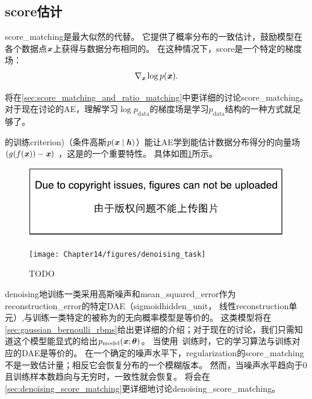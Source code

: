 
\subsection{\gls{score}估计}
\label{sec:estimating_the_score}
\gls{score_matching}\citep{Hyvarinen-2005}是最大似然的代替。
它提供了概率分布的一致估计，鼓励模型在各个数据点$\boldsymbol{\mathit{x}}$上获得与数据分布相同的。
在这种情况下，\gls{score}是一个特定的梯度场：
\begin{align}
 \nabla_{\boldsymbol{\mathit{x}}} \log p(\boldsymbol{\mathit{x}}) .
\end{align}

将在\ref{sec:score_matching_and_ratio_matching}中更详细的讨论\gls{score_matching}。
对于现在讨论的\gls{AE}，理解学习$\log p_{\text{data}}$的梯度场是学习$p_{\text{data}}$结构的一种方式就足够了。


的训练\gls{criterion})（条件高斯$p(\boldsymbol{\mathit{x}} \mid \boldsymbol{\mathit{h}})$）能让\gls{AE}学到能估计数据分布得分的向量场$(g(f(\boldsymbol{\mathit{x}}))-\boldsymbol{\mathit{x}})$ ，这是的一个重要特性。
具体如图\ref{fig:chap14_denoising_task}所示。

\begin{figure}[!htb]
\ifOpenSource
\centerline{\includegraphics{figure.pdf}}
\else
\centerline{\texttt{[image: Chapter14/figures/denoising\_task]}}
\fi
\caption{TODO}
\label{fig:chap14_denoising_task}
\end{figure}

\gls{denoising}地训练一类采用高斯噪声和\gls{mean_squared_error}作为\gls{reconstruction_error}的特定\gls{DAE}（sigmoid\gls{hidden_unit}， 线性\gls{reconstruction}单元）,与训练一类特定的被称为的无向概率模型是等价的\citep{Vincent-NC-2011-small}。
这类模型将在\ref{sec:gaussian_bernoulli_rbms}给出更详细的介绍；对于现在的讨论，我们只需知道这个模型能显式的给出$p_{\text{model}}(\boldsymbol{\mathit{x}}; \boldsymbol{\theta})$。
当使用~\citep{Kingma+LeCun-2010-small}训练时，它的学习算法与训练对应的\gls{DAE}是等价的。
在一个确定的噪声水平下，\gls{regularization}的\gls{score_matching}不是一致估计量；相反它会恢复分布的一个模糊版本。
然而，当噪声水平趋向于0且训练样本数趋向与无穷时，一致性就会恢复。
将会在\ref{sec:denoising_score_matching}更详细地讨论\gls{denoising_score_matching}。


